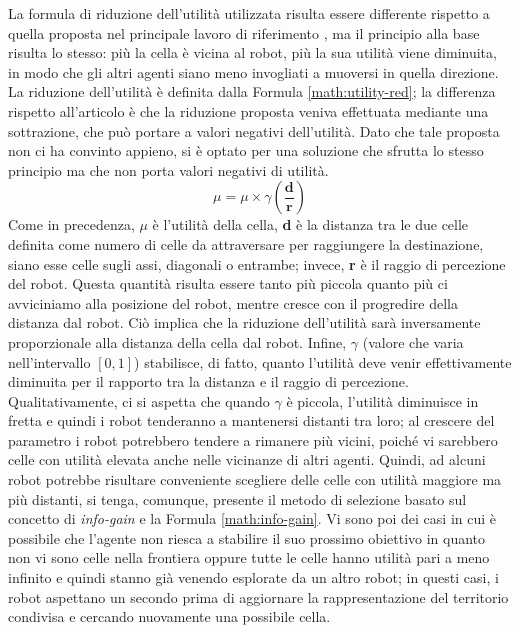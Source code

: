 La formula di riduzione dell'utilità utilizzata risulta essere differente rispetto a quella proposta nel principale lavoro di riferimento \cite{burgard2005}, ma il principio alla base risulta lo stesso: più la cella è vicina al robot, più la sua utilità viene diminuita, in modo che gli altri agenti siano meno invogliati a muoversi in quella direzione.
La riduzione dell'utilità è definita dalla Formula \ref{math:utility-red}; la differenza rispetto all'articolo è che la riduzione proposta veniva effettuata mediante una sottrazione, che può portare a valori negativi dell'utilità. Dato che tale proposta non ci ha convinto appieno, si è optato per una soluzione che sfrutta lo stesso principio ma che non porta valori negativi di utilità. 
\begin{equation}
	\label{math:utility-red}
	\mu = \mu\times\gamma\left(\frac{\textbf{d}}{\textbf{r}}\right)
\end{equation}
Come in precedenza, $\mu$ è l'utilità della cella, \textbf{d} è la distanza tra le due celle definita come numero di celle da attraversare per raggiungere la destinazione, siano esse celle sugli assi, diagonali o entrambe; invece, \textbf{r} è il raggio di percezione del robot. 
Questa quantità risulta essere tanto più piccola quanto più ci avviciniamo alla posizione del robot, mentre cresce con il progredire della distanza dal robot. Ciò implica che la riduzione dell'utilità sarà inversamente proporzionale alla distanza della cella dal robot.
Infine, $\gamma$ (valore che varia nell'intervallo $\left[0, 1\right]$) stabilisce, di fatto, quanto l'utilità deve venir effettivamente diminuita per il rapporto tra la distanza e il raggio di percezione. 
Qualitativamente, ci si aspetta che quando $\gamma$ è piccola, l'utilità diminuisce in fretta e quindi i robot tenderanno a mantenersi distanti tra loro; al crescere del parametro i robot potrebbero tendere a rimanere più vicini, poiché vi sarebbero celle con utilità elevata anche nelle vicinanze di altri agenti.
Quindi, ad alcuni robot potrebbe risultare conveniente scegliere delle celle con utilità maggiore ma più distanti, si tenga, comunque, presente il metodo di selezione basato sul concetto di \textit{info-gain} e la Formula \ref{math:info-gain}.
Vi sono poi dei casi in cui è possibile che l'agente non riesca a stabilire il suo prossimo obiettivo in quanto non vi sono celle nella frontiera oppure tutte le celle hanno utilità pari a meno infinito e quindi stanno già venendo esplorate da un altro robot; in questi casi, i robot aspettano un secondo prima di aggiornare la rappresentazione del territorio condivisa e cercando nuovamente una possibile cella.\\
